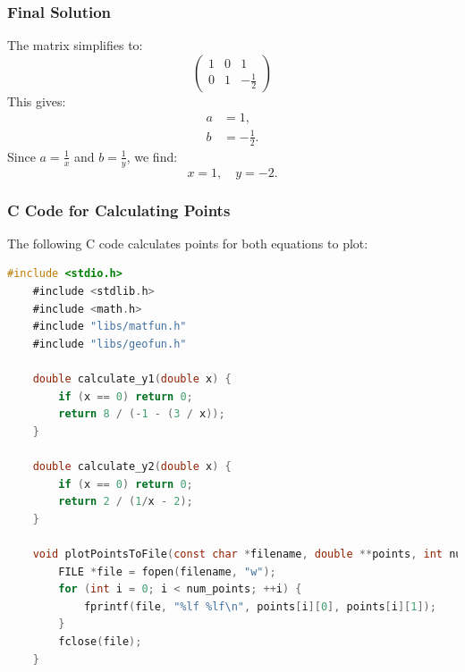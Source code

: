 \documentclass{beamer}
\begin{document}
\begin{frame}
    \frametitle{Final Solution}
    The matrix simplifies to:
    \[
    \begin{pmatrix} 1 & 0 & 1 \\ 0 & 1 & -\frac{1}{2} \end{pmatrix}
    \]
    This gives:
    \begin{align*}
        a &= 1, \\
        b &= -\frac{1}{2}.
    \end{align*}
    Since \( a = \frac{1}{x} \) and \( b = \frac{1}{y} \), we find:
    \[
    x = 1, \quad y = -2.
    \]
\end{frame}

\begin{frame}[fragile]
    \frametitle{C Code for Calculating Points}
    The following C code calculates points for both equations to plot:
    \begin{lstlisting}[language=C]
    #include <stdio.h>
    #include <stdlib.h>
    #include <math.h>
    #include "libs/matfun.h"
    #include "libs/geofun.h"

    double calculate_y1(double x) {
        if (x == 0) return 0; 
        return 8 / (-1 - (3 / x));
    }

    double calculate_y2(double x) {
        if (x == 0) return 0;
        return 2 / (1/x - 2);
    }

    void plotPointsToFile(const char *filename, double **points, int num_points) {
        FILE *file = fopen(filename, "w");
        for (int i = 0; i < num_points; ++i) {
            fprintf(file, "%lf %lf\n", points[i][0], points[i][1]);
        }
        fclose(file);
    }
    \end{lstlisting}
\end{frame}
\end{document}
